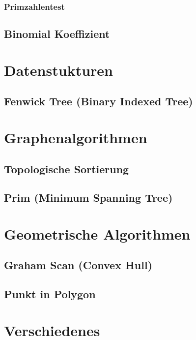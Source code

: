 \documentclass[10pt,a4paper,ngerman]{article}
\begin{document}
\subsubsection{Primzahlentest}

\subsection{Binomial Koeffizient}



\section{Datenstukturen}
\subsection{Fenwick Tree (Binary Indexed Tree)}


\section{Graphenalgorithmen}
\subsection{Topologische Sortierung}

\subsection{Prim (Minimum Spanning Tree)}


\section{Geometrische Algorithmen}
\subsection{Graham Scan (Convex Hull)}

\subsection{Punkt in Polygon}

\section{Verschiedenes}
\end{document}
